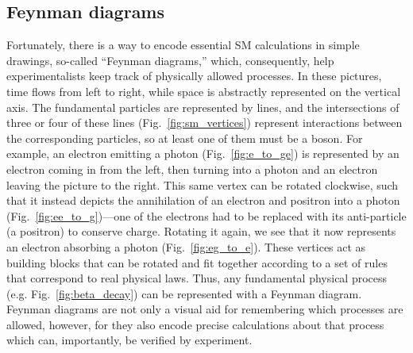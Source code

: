 \subsection{Feynman diagrams}
Fortunately, there is a way to encode essential SM calculations in simple drawings, so-called ``Feynman diagrams,'' which, consequently, help experimentalists keep track of physically allowed processes. 
In these pictures, time flows from left to right, while space is abstractly represented on the vertical axis\footnotemark{}. 
The fundamental particles are represented by lines, and the intersections of three or four of these lines (Fig.~\ref{fig:sm_vertices}) represent interactions between the corresponding particles, so at least one of them must be a boson. 
For example, an electron emitting a photon (Fig.~\ref{fig:e_to_ge}) is represented by an electron coming in from the left, then turning into a photon and an electron leaving the picture to the right. 
This same vertex can be rotated clockwise, such that it instead depicts the annihilation of an electron and positron into a photon (Fig.~\ref{fig:ee_to_g})---one of the electrons had to be replaced with its anti-particle (a positron) to conserve charge. 
Rotating it again, we see that it now represents an electron absorbing a photon (Fig.~\ref{fig:eg_to_e}). 
These vertices act as building blocks that can be rotated and fit together according to a set of rules that correspond to real physical laws. 
Thus, any fundamental physical process (e.g. Fig.~\ref{fig:beta_decay}) can be represented with a Feynman diagram. 
Feynman diagrams are not only a visual aid for remembering which processes are allowed, however, for they also encode precise calculations about that process which can, importantly, be verified by experiment.

